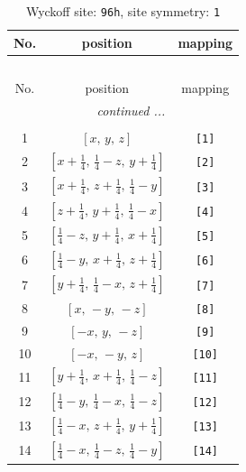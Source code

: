 \documentclass[fleqn,8pt]{jsarticle}
\begin{document}
\begin{longtable}{ccc}
\caption{Wyckoff site: {\tt 96h}, site symmetry: {\tt 1}}
 \\
 \hline \hline
No. & position & mapping \\ \hline \endfirsthead

\multicolumn{2}{l}{\tablename\ \thetable{}} \\
 \hline \hline
No. & position & mapping \\ \hline \endhead

 \hline \hline
\multicolumn{2}{r}{\footnotesize\it continued ...} \\ \endfoot

 \hline \hline
\multicolumn{2}{r}{} \\ \endlastfoot

1 & $\left[ x,\, y,\, z \right]$ & {\tt [1]} \\ \hline
2 & $\left[ x + \frac{1}{4},\, \frac{1}{4} - z,\, y + \frac{1}{4} \right]$ & {\tt [2]} \\ \hline
3 & $\left[ x + \frac{1}{4},\, z + \frac{1}{4},\, \frac{1}{4} - y \right]$ & {\tt [3]} \\ \hline
4 & $\left[ z + \frac{1}{4},\, y + \frac{1}{4},\, \frac{1}{4} - x \right]$ & {\tt [4]} \\ \hline
5 & $\left[ \frac{1}{4} - z,\, y + \frac{1}{4},\, x + \frac{1}{4} \right]$ & {\tt [5]} \\ \hline
6 & $\left[ \frac{1}{4} - y,\, x + \frac{1}{4},\, z + \frac{1}{4} \right]$ & {\tt [6]} \\ \hline
7 & $\left[ y + \frac{1}{4},\, \frac{1}{4} - x,\, z + \frac{1}{4} \right]$ & {\tt [7]} \\ \hline
8 & $\left[ x,\, - y,\, - z \right]$ & {\tt [8]} \\ \hline
9 & $\left[ - x,\, y,\, - z \right]$ & {\tt [9]} \\ \hline
10 & $\left[ - x,\, - y,\, z \right]$ & {\tt [10]} \\ \hline
11 & $\left[ y + \frac{1}{4},\, x + \frac{1}{4},\, \frac{1}{4} - z \right]$ & {\tt [11]} \\ \hline
12 & $\left[ \frac{1}{4} - y,\, \frac{1}{4} - x,\, \frac{1}{4} - z \right]$ & {\tt [12]} \\ \hline
13 & $\left[ \frac{1}{4} - x,\, z + \frac{1}{4},\, y + \frac{1}{4} \right]$ & {\tt [13]} \\ \hline
14 & $\left[ \frac{1}{4} - x,\, \frac{1}{4} - z,\, \frac{1}{4} - y \right]$ & {\tt [14]} \\ \hline

\end{longtable}
\end{document}
